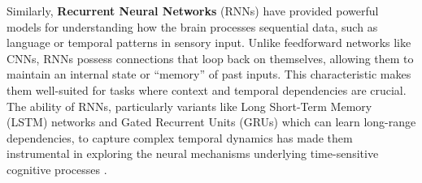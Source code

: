 Similarly, \textbf{Recurrent Neural Networks} (RNNs) have provided powerful models for understanding how the brain processes sequential data, such as language or temporal patterns in sensory input. Unlike feedforward networks like CNNs, RNNs possess connections that loop back on themselves, allowing them to maintain an internal state or ``memory'' of past inputs. This characteristic makes them well-suited for tasks where context and temporal dependencies are crucial. The ability of RNNs, particularly variants like Long Short-Term Memory (LSTM) networks and Gated Recurrent Units (GRUs) which can learn long-range dependencies, to capture complex temporal dynamics has made them instrumental in exploring the neural mechanisms underlying time-sensitive cognitive processes \cite{richards2019deep}.

\clearpage
